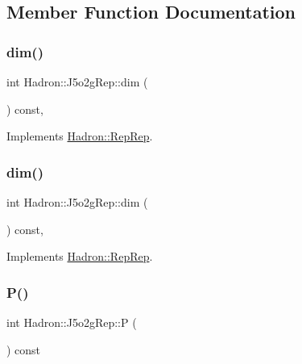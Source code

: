 \subsection{Member Function Documentation}
\mbox{\label{structHadron_1_1J5o2gRep_a28245b28e8ded3f052453178f8d57da9}} 
\subsubsection{\texorpdfstring{dim()}{dim()}\hspace{0.1cm}{\footnotesize\ttfamily [1/2]}}
{\footnotesize\ttfamily int Hadron\+::\+J5o2g\+Rep\+::dim (\begin{DoxyParamCaption}{ }\end{DoxyParamCaption}) const\hspace{0.3cm}{\ttfamily [inline]}, {\ttfamily [virtual]}}



Implements \mbox{\hyperlink{structHadron_1_1RepRep_a92c8802e5ed7afd7da43ccfd5b7cd92b}{Hadron\+::\+Rep\+Rep}}.

\mbox{\label{structHadron_1_1J5o2gRep_a28245b28e8ded3f052453178f8d57da9}} 
\subsubsection{\texorpdfstring{dim()}{dim()}\hspace{0.1cm}{\footnotesize\ttfamily [2/2]}}
{\footnotesize\ttfamily int Hadron\+::\+J5o2g\+Rep\+::dim (\begin{DoxyParamCaption}{ }\end{DoxyParamCaption}) const\hspace{0.3cm}{\ttfamily [inline]}, {\ttfamily [virtual]}}



Implements \mbox{\hyperlink{structHadron_1_1RepRep_a92c8802e5ed7afd7da43ccfd5b7cd92b}{Hadron\+::\+Rep\+Rep}}.

\mbox{\label{structHadron_1_1J5o2gRep_a6ffd7d1f06f5779fdf3ecdd30a5f0f10}} 
\subsubsection{\texorpdfstring{P()}{P()}\hspace{0.1cm}{\footnotesize\ttfamily [1/2]}}
{\footnotesize\ttfamily int Hadron\+::\+J5o2g\+Rep\+::P (\begin{DoxyParamCaption}{ }\end{DoxyParamCaption}) const\hspace{0.3cm}{\ttfamily [inline]}}

